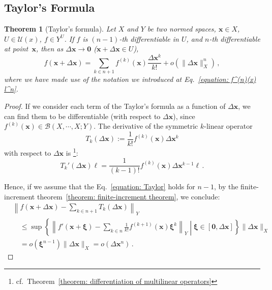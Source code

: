 \documentclass[openany]{book}
\theoremstyle{plain}
\newtheorem{theorem}{Theorem}[section] %
\theoremstyle{definition}
\newcommand*{\bv}{\boldsymbol} %
\begin{document}
\subsection{Taylor's Formula}
\begin{theorem}[Taylor's formula]
	Let $X$ and $Y$ be two normed spaces, $\bv x \in X$, $U \in \mathscr U(x)$, $f \in Y^U$. 
	If $f$ is $(n-1)$-th differentiable in $U$, and $n$-th differentiable at point~$\bv x$, then as $\Delta \bv x \to \bv 0$ ($\bv x + \Delta \bv x \in U$), 
	\begin{equation}\label{equation: Taylor}
		f(\bv x + \Delta \bv x) = \sum_{k \in n + 1} f^{(k)}(\bv x) \frac{\Delta \bv x^k}{k !} + o(\|\Delta \bv x\|_X^n)\,,
	\end{equation}
	where we have made use of the notation we introduced at Eq.~\eqref{equation: f^(n)(x) l^n}.
\end{theorem}
\begin{proof}
	If we consider each term of the Taylor's formula as a function of $\Delta \bv x$, we can find them to be differentiable (with respect to $\Delta \bv x$), since $f^{(k)}(\bv x) \in \mathcal B(X, \cdots, X; Y)$. The derivative of the symmetric $k$-linear operator
	\begin{equation*}
		T_k(\Delta \bv x) := \frac{1}{k!} f^{(k)}(\bv x) \Delta \bv x^k
	\end{equation*}
	with respect to $\Delta \bv x$ is%
		\footnote{cf.~Theorem~\ref{theorem: differentiation of multilinear operators}}:
	\begin{equation*}
		T_k'(\Delta \bv x) \bv \ell = \frac{1}{(k - 1)!} f^{(k)}(\bv x) \Delta \bv x^{k - 1} \bv \ell\,.
	\end{equation*}

	Hence, if we assume that the Eq.~\eqref{equation: Taylor} holds for $n - 1$, by the finite-increment theorem~\ref{theorem: finite-increment theorem}, we conclude:
	\begin{align*}
		&\left\|
			f(\bv x + \Delta \bv x) - \sum_{k \in n + 1} T_k(\Delta \bv x)
		\right\|_Y 
		\\
		&\quad
			\leq \sup \left\{
				\left\|
					f'(\bv x + \bv \xi) - \sum_{k \in n} \frac{1}{k!} f^{(k + 1)}(\bv x) \bv \xi^k
				\right\|_Y
			\middle|
				\bv \xi \in [\bv 0, \Delta \bv x]
			\right\} \|\Delta \bv x\|_X 
			\\
		&\quad
			= o(\bv \xi^{n-1}) \|\Delta \bv x\|_X = o(\Delta \bv x^n)\,.
	\end{align*}
\end{proof}
\end{document}
